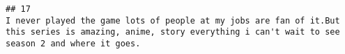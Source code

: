 \documentclass[
]{article}
\begin{document}
\begin{verbatim}
## 17                                                                                                                                                                                                                                                                                                                                                                                                                                                                                                                                                                                                                                                                                                                                                                                                                                                                                                                                                                                                                                                                                                                                                                                                                                                                                                                                                                                                                                                                                                                                                                                                                                                                                                                                                                                                                                                                                                                                                                                                                                                                                                                                                                                                                                                                                                                                                                                                                                                                                                                                                                                                                                                                                                                                                                                                                                                                                              I never played the game lots of people at my jobs are fan of it.But this series is amazing, anime, story everything i can't wait to see season 2 and where it goes.

\end{verbatim}
\end{document}
